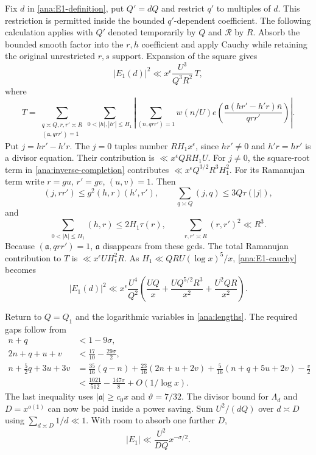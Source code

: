 Fix $d$ in \eqref{ana:E1-definition}, put $Q'=dQ$ and restrict $q'$
to multiples of $d$. This restriction is permitted inside the bounded
$q'$-dependent coefficient. The following calculation applies with
$Q'$ denoted temporarily by $Q$ and $\mathcal R$ by $R$.
Absorb the bounded smooth factor into the $r,h$ coefficient and apply
Cauchy while retaining the original unrestricted $r,s$ support. Expansion
of the square gives
\begin{equation}
 |E_1(d)|^2\ll x^\epsilon\frac{U^3}{Q^3R^2}\,T,
 \label{ana:E1-cauchy}
\end{equation}
where
\[
 T=\sum_{\substack{q\asymp Q, r,r'\asymp R\\(\mathfrak{a},qrr')=1}}
       \sum_{0<|h|,|h'|\le H_1}
 \left|\sum_{(n,qrr')=1}w(n/U)
 e\left(\frac{\mathfrak{a}(hr'-h'r)\overline n}{qrr'}\right)\right|.
\]
Put $j=hr'-h'r$. The $j=0$ tuples number $RH_1x^\epsilon$, since
$hr'\ne0$ and $h'r=hr'$ is a divisor equation. Their contribution is
$\ll x^\epsilon QRH_1U$. For $j\ne0$, the square-root term in
\eqref{ana:inverse-completion} contributes
$\ll x^\epsilon Q^{3/2}R^3H_1^2$.
For its Ramanujan term write $r=gu$, $r'=gv$, $(u,v)=1$. Then
\[
 (j,rr')\le g^2(h,r)(h',r'),\qquad
 \sum_{q\asymp Q}(j,q)\le3Q\tau(|j|),
\]
and
\[
 \sum_{0<|h|\le H_1}(h,r)\le2H_1\tau(r),\qquad
 \sum_{r,r'\asymp R}(r,r')^2\ll R^3.
\]
Because $(\mathfrak{a},qrr')=1$, $\mathfrak{a}$ disappears from these gcds. The total
Ramanujan contribution to $T$ is $\ll x^\epsilon UH_1^2R$.
As $H_1\ll QRU(\log x)^5/x$, \eqref{ana:E1-cauchy} becomes
\begin{equation}
 |E_1(d)|^2\ll x^\epsilon\frac{U^4}{Q^2}
  \left(\frac{UQ}{x}+\frac{UQ^{5/2}R^3}{x^2}
                         +\frac{U^2QR}{x^2}\right).
 \label{ana:E1-polynomial}
\end{equation}

Return to $Q=Q_1$ and the logarithmic variables in
\eqref{ana:lengths}. The required gaps follow from
\begin{align*}
 n+q&<1-9\sigma,\\
 2n+q+u+v&<\frac{17}{10}-\frac{29\sigma}2,\\
 n+\frac52q+3u+3v
 &=\frac{35}{16}(q-n)+\frac{23}{16}(2n+u+2v)
   +\frac5{16}(n+q+5u+2v)-\frac v2\\
 &<\frac{1021}{512}-\frac{147\sigma}{8}+O(1/\log x).
\end{align*}
The last inequality uses $|\mathfrak{a}|\ge c_0x$ and $\vartheta=7/32$.
The divisor bound for $\Lambda_d$ and $D=x^{o(1)}$ can now be paid
inside a power saving. Sum $U^2/(dQ)$ over $d\asymp D$ using
$\sum_{d\asymp D}1/d\ll1$. With room to absorb one further $D$,
\begin{equation}
 |E_1|\ll\frac{U^2}{DQ}x^{-\sigma/2}.
 \label{ana:E1-final}
\end{equation}


